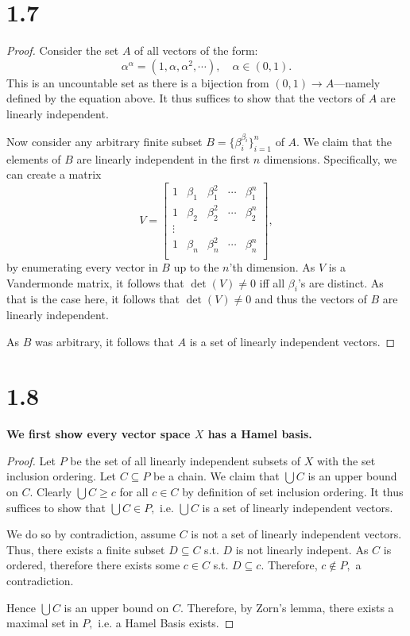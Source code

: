 \documentclass[10pt]{article}
\begin{document}

\section*{1.7}

\begin{proof}
    Consider the set $A$ of all vectors of the form:
    \[\alpha^\alpha = (1,\alpha,\alpha^2,\cdots),\quad \alpha \in (0,1).\]
    This is an uncountable set as there is a bijection from $(0,1)\to A$---namely defined by the equation above. It thus suffices to show that the vectors of $A$ are linearly independent.

    Now consider any arbitrary finite subset $B=\{\beta_i^{\beta_i}\}_{i=1}^n$ of $A.$ We claim that the elements of $B$ are linearly independent in the first $n$ dimensions. Specifically, we can create a matrix
    \[V = \begin{bmatrix}
        1 & \beta_1 & \beta_1^2 & \cdots & \beta_1^n\\
        1 & \beta_2 & \beta_2^2 & \cdots & \beta_2^n\\
        \vdots\\
        1 & \beta_n & \beta_n^2 & \cdots & \beta_n^n\\
    \end{bmatrix},\]
    by enumerating every vector in $B$ up to the $n$'th dimension. As $V$ is a Vandermonde matrix, it follows that $\det(V)\neq0$ iff all $\beta_i$'s are distinct. As that is the case here, it follows that $\det(V)\neq 0$ and thus the vectors of $B$ are linearly independent. 
    
    As $B$ was arbitrary, it follows that $A$ is a set of linearly independent vectors.
\end{proof}

\section*{1.8}

\textbf{We first show every vector space $X$ has a Hamel basis.}
\begin{proof}
    Let $P$ be the set of all linearly independent subsets of $X$ with the set inclusion ordering. Let $C \subseteq P$ be a chain. We claim that $\bigcup C$ is an upper bound on $C.$ Clearly $\bigcup C \ge c$ for all $c\in C$ by definition of set inclusion ordering. It thus suffices  to show that $\bigcup C \in P,$ i.e. $\bigcup C$ is a set of linearly independent vectors.

    We do so by contradiction, assume $C$ is not a set of linearly independent vectors. Thus, there exists a finite subset $D \subseteq C$ s.t. $D$ is not linearly indepent. As $C$ is ordered, therefore there exists some $c \in C$ s.t. $D \subseteq c.$ Therefore, $c\notin P,$ a contradiction.

    Hence $\bigcup C$ is an upper bound on $C.$ Therefore, by Zorn's lemma, there exists a maximal set in $P,$ i.e. a Hamel Basis exists.
\end{proof}
\end{document}
